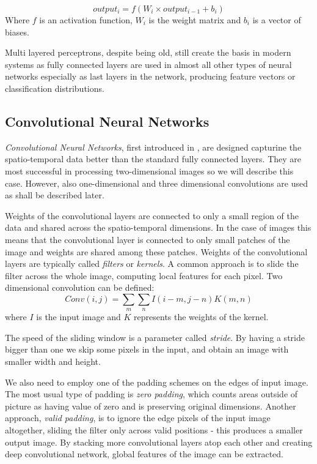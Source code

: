 $$output_i = f(W_i \times output_{i-1} + b_i)$$
Where $f$ is an activation function, $W_i$ is the weight matrix and $b_i$ is a vector of biases.\par  
Multi layered perceptrons, despite being old, still create the basis in modern systems as fully connected layers are used in almost all other types of neural networks especially as last layers in the network, producing feature vectors or classification distributions.



\subsection{Convolutional Neural Networks}
\textit{Convolutional Neural Networks}, first introduced in \cite{lecun_backpropagation_1989}, are designed capturine the spatio-temporal data better than the standard fully connected layers. They are most successful in processing two-dimensional images so we will describe this case. However, also one-dimensional and three dimensional convolutions are used as shall be described later.  \par
Weights of the convolutional layers are connected to only a small region of the data and shared across the spatio-temporal dimensions. In the case of images this means that the convolutional layer is connected to only small patches of the image and weights are shared among these patches. Weights of the convolutional layers are typically called \textit{filters} or \textit{kernels}. A common approach is to slide the filter across the whole image,  computing local features for each pixel.
Two dimensional convolution can be defined:
$$Conv(i,j) = \sum_m {\sum_n {I(i-m,j-n)K(m,n)}}$$ where $I$ is the input image and $K$ represents the weights of the kernel.\par
The speed of the sliding window is a parameter called \textit{stride}. By having a stride bigger than one we skip some pixels in the input, and obtain an image with smaller width and height.\par 
We also need to employ one of the padding schemes on the edges of input image. The most usual type of padding is \textit{zero padding}, which counts areas outside of picture as having value of zero and is preserving original dimensions. Another approach, \textit{valid padding}, is to ignore the edge pixels of the input image altogether, sliding the filter only across valid positions - this produces a smaller output image.
By stacking more convolutional layers atop each other and creating deep convolutional network,  global features of the image can be extracted. 
